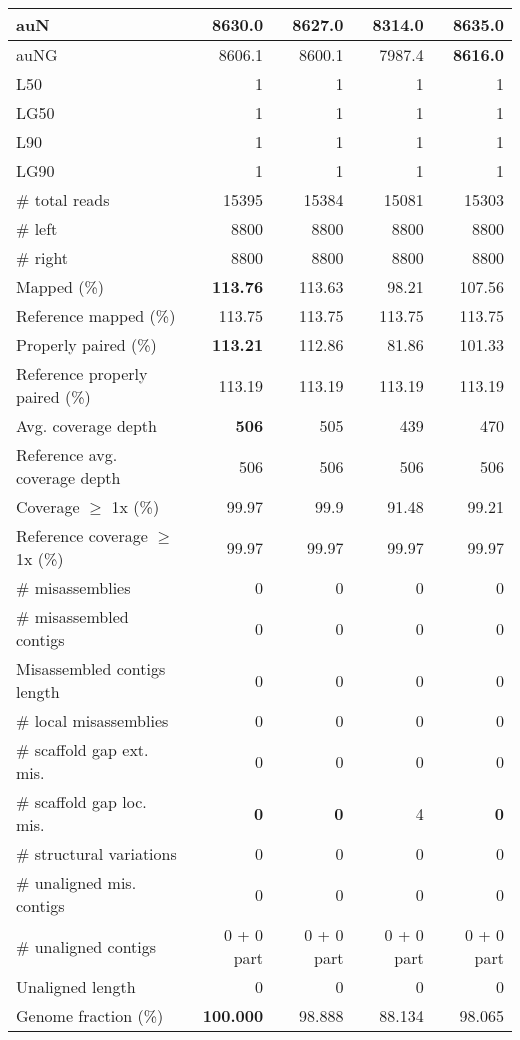 \documentclass[12pt,a4paper]{article}
\begin{document}
\begin{table}[ht]
\begin{center}
\begin{tabular}{|l*{4}{|r}|}
auN & 8630.0 & 8627.0 & 8314.0 & {\bf 8635.0} \\ \hline
auNG & 8606.1 & 8600.1 & 7987.4 & {\bf 8616.0} \\ \hline
L50 & 1 & 1 & 1 & 1 \\ \hline
LG50 & 1 & 1 & 1 & 1 \\ \hline
L90 & 1 & 1 & 1 & 1 \\ \hline
LG90 & 1 & 1 & 1 & 1 \\ \hline
\# total reads & 15395 & 15384 & 15081 & 15303 \\ \hline
\# left & 8800 & 8800 & 8800 & 8800 \\ \hline
\# right & 8800 & 8800 & 8800 & 8800 \\ \hline
Mapped (\%) & {\bf 113.76} & 113.63 & 98.21 & 107.56 \\ \hline
Reference mapped (\%) & 113.75 & 113.75 & 113.75 & 113.75 \\ \hline
Properly paired (\%) & {\bf 113.21} & 112.86 & 81.86 & 101.33 \\ \hline
Reference properly paired (\%) & 113.19 & 113.19 & 113.19 & 113.19 \\ \hline
Avg. coverage depth & {\bf 506} & 505 & 439 & 470 \\ \hline
Reference avg. coverage depth & 506 & 506 & 506 & 506 \\ \hline
Coverage $\geq$ 1x (\%) & 99.97 & 99.9 & 91.48 & 99.21 \\ \hline
Reference coverage $\geq$ 1x (\%) & 99.97 & 99.97 & 99.97 & 99.97 \\ \hline
\# misassemblies & 0 & 0 & 0 & 0 \\ \hline
\# misassembled contigs & 0 & 0 & 0 & 0 \\ \hline
Misassembled contigs length & 0 & 0 & 0 & 0 \\ \hline
\# local misassemblies & 0 & 0 & 0 & 0 \\ \hline
\# scaffold gap ext. mis. & 0 & 0 & 0 & 0 \\ \hline
\# scaffold gap loc. mis. & {\bf 0} & {\bf 0} & 4 & {\bf 0} \\ \hline
\# structural variations & 0 & 0 & 0 & 0 \\ \hline
\# unaligned mis. contigs & 0 & 0 & 0 & 0 \\ \hline
\# unaligned contigs & 0 + 0 part & 0 + 0 part & 0 + 0 part & 0 + 0 part \\ \hline
Unaligned length & 0 & 0 & 0 & 0 \\ \hline
Genome fraction (\%) & {\bf 100.000} & 98.888 & 88.134 & 98.065 \\ \hline

\end{tabular}
\end{center}
\end{table}
\end{document}
